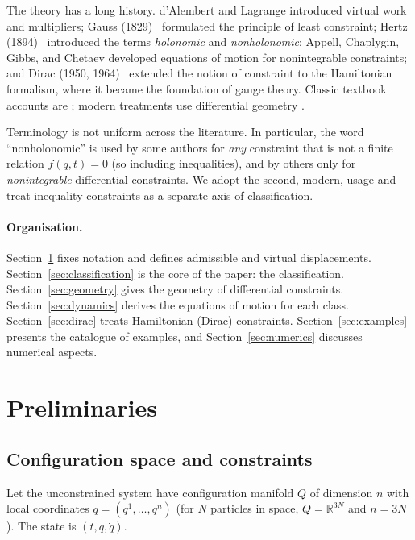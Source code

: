 \documentclass[11pt,a4paper]{article}
\theoremstyle{definition}
\theoremstyle{plain}
\theoremstyle{remark}
\newcommand{\R}{\mathbb{R}}
\begin{document}
The theory has a long history. d'Alembert and Lagrange introduced virtual work and
multipliers; Gauss (1829)~\cite{Gauss1829} formulated the principle of least constraint; Hertz (1894)~\cite{Hertz1894}
introduced the terms \emph{holonomic} and \emph{nonholonomic}; Appell, Chaplygin,
Gibbs, and Chetaev developed equations of motion for nonintegrable constraints; and Dirac
(1950, 1964)~\cite{Dirac1950,Dirac1964} extended the notion of constraint to the Hamiltonian formalism, where it
became the foundation of gauge theory. Classic textbook accounts are \cite{Whittaker1937,Lanczos1970,Pars1965,LandauLifshitz1976,GoldsteinPS2002};
modern treatments use differential geometry
\cite{Arnold1989,NeimarkFufaev1972,Bloch2003,BullLewis2005}.

Terminology is not uniform across the literature. In particular, the word
``nonholonomic'' is used by some authors for \emph{any} constraint that is not a finite
relation $f(q,t)=0$ (so including inequalities), and by others only for
\emph{nonintegrable} differential constraints. We adopt the second, modern, usage and
treat inequality constraints as a separate axis of classification.

\paragraph{Organisation.} Section~\ref{sec:prelim} fixes notation and defines admissible
and virtual displacements. Section~\ref{sec:classification} is the core of the paper: the
classification. Section~\ref{sec:geometry} gives the geometry of differential constraints.
Section~\ref{sec:dynamics} derives the equations of motion for each class.
Section~\ref{sec:dirac} treats Hamiltonian (Dirac) constraints. Section~\ref{sec:examples}
presents the catalogue of examples, and Section~\ref{sec:numerics} discusses numerical
aspects.

\section{Preliminaries}\label{sec:prelim}
\subsection{Configuration space and constraints}
Let the unconstrained system have configuration manifold $Q$ of dimension $n$ with local
coordinates $q=(q^1,\dots,q^n)$ (for $N$ particles in space, $Q=\R^{3N}$ and $n=3N$). The
state is $(t,q,\dot q)$.
\end{document}
